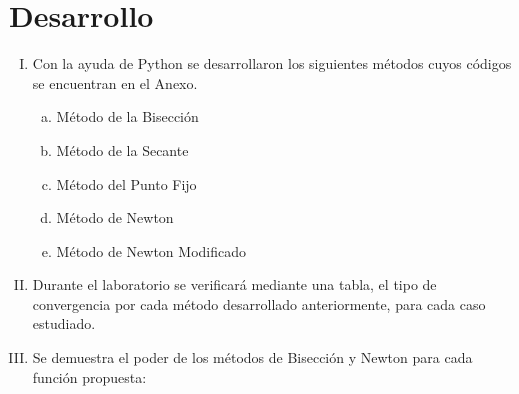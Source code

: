 \documentclass{article}
\begin{document}
\section{Desarrollo}
\begin{enumerate}[I)]

\item Con la ayuda de Python se desarrollaron los siguientes métodos cuyos códigos se encuentran en el Anexo.
\begin{enumerate}[a)]
\item Método de la Bisección
\item Método de la Secante
\item Método del Punto Fijo
\item Método de Newton
\item Método de Newton Modificado
\end{enumerate}

\item Durante el laboratorio se verificará mediante una tabla, el tipo de convergencia por cada método desarrollado anteriormente, para cada caso estudiado.

\newpage

\item Se demuestra el poder de los métodos de Bisección y Newton para cada función propuesta:
\begin{enumerate}[(1)]


\end{enumerate}
\end{enumerate}
\end{document}
